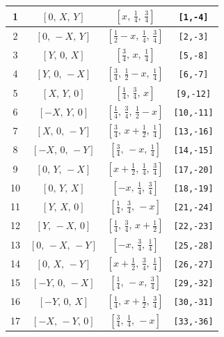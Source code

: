 \documentclass[fleqn,8pt]{jsarticle}
\begin{document}
\begin{longtable}{cccc}
1 & $\left[ 0,\, X,\, Y \right]$ & $\left[ x,\, \frac{1}{4},\, \frac{3}{4} \right]$ & {\tt [1,-4]} \\ \hline
2 & $\left[ 0,\, - X,\, Y \right]$ & $\left[ \frac{1}{2} - x,\, \frac{1}{4},\, \frac{3}{4} \right]$ & {\tt [2,-3]} \\ \hline
3 & $\left[ Y,\, 0,\, X \right]$ & $\left[ \frac{3}{4},\, x,\, \frac{1}{4} \right]$ & {\tt [5,-8]} \\ \hline
4 & $\left[ Y,\, 0,\, - X \right]$ & $\left[ \frac{3}{4},\, \frac{1}{2} - x,\, \frac{1}{4} \right]$ & {\tt [6,-7]} \\ \hline
5 & $\left[ X,\, Y,\, 0 \right]$ & $\left[ \frac{1}{4},\, \frac{3}{4},\, x \right]$ & {\tt [9,-12]} \\ \hline
6 & $\left[ - X,\, Y,\, 0 \right]$ & $\left[ \frac{1}{4},\, \frac{3}{4},\, \frac{1}{2} - x \right]$ & {\tt [10,-11]} \\ \hline
7 & $\left[ X,\, 0,\, - Y \right]$ & $\left[ \frac{3}{4},\, x + \frac{1}{2},\, \frac{1}{4} \right]$ & {\tt [13,-16]} \\ \hline
8 & $\left[ - X,\, 0,\, - Y \right]$ & $\left[ \frac{3}{4},\, - x,\, \frac{1}{4} \right]$ & {\tt [14,-15]} \\ \hline
9 & $\left[ 0,\, Y,\, - X \right]$ & $\left[ x + \frac{1}{2},\, \frac{1}{4},\, \frac{3}{4} \right]$ & {\tt [17,-20]} \\ \hline
10 & $\left[ 0,\, Y,\, X \right]$ & $\left[ - x,\, \frac{1}{4},\, \frac{3}{4} \right]$ & {\tt [18,-19]} \\ \hline
11 & $\left[ Y,\, X,\, 0 \right]$ & $\left[ \frac{1}{4},\, \frac{3}{4},\, - x \right]$ & {\tt [21,-24]} \\ \hline
12 & $\left[ Y,\, - X,\, 0 \right]$ & $\left[ \frac{1}{4},\, \frac{3}{4},\, x + \frac{1}{2} \right]$ & {\tt [22,-23]} \\ \hline
13 & $\left[ 0,\, - X,\, - Y \right]$ & $\left[ - x,\, \frac{3}{4},\, \frac{1}{4} \right]$ & {\tt [25,-28]} \\ \hline
14 & $\left[ 0,\, X,\, - Y \right]$ & $\left[ x + \frac{1}{2},\, \frac{3}{4},\, \frac{1}{4} \right]$ & {\tt [26,-27]} \\ \hline
15 & $\left[ - Y,\, 0,\, - X \right]$ & $\left[ \frac{1}{4},\, - x,\, \frac{3}{4} \right]$ & {\tt [29,-32]} \\ \hline
16 & $\left[ - Y,\, 0,\, X \right]$ & $\left[ \frac{1}{4},\, x + \frac{1}{2},\, \frac{3}{4} \right]$ & {\tt [30,-31]} \\ \hline
17 & $\left[ - X,\, - Y,\, 0 \right]$ & $\left[ \frac{3}{4},\, \frac{1}{4},\, - x \right]$ & {\tt [33,-36]} \\ \hline

\end{longtable}
\end{document}
